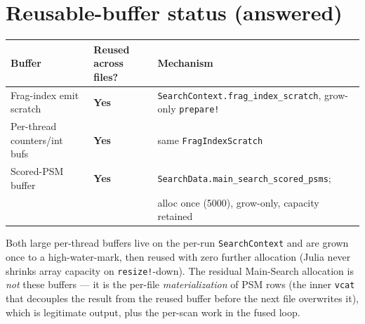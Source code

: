 \documentclass[11pt]{article}
\newcommand{\code}[1]{\texttt{\small #1}}
\begin{document}
\section{Reusable-buffer status (answered)}
\begin{center}
\begin{tabular}{lll}
\toprule
\textbf{Buffer} & \textbf{Reused across files?} & \textbf{Mechanism} \\
\midrule
Frag-index emit scratch & \textcolor{hi}{\textbf{Yes}} & \code{SearchContext.frag\_index\_scratch}, grow-only \code{prepare!} \\
Per-thread counters/int bufs & \textcolor{hi}{\textbf{Yes}} & same \code{FragIndexScratch} \\
Scored-PSM buffer & \textcolor{hi}{\textbf{Yes}} & \code{SearchData.main\_search\_scored\_psms}; \\
 & & alloc once (5000), grow-only, capacity retained \\
\bottomrule
\end{tabular}
\end{center}
\noindent Both large per-thread buffers live on the per-run \code{SearchContext}
and are grown once to a high-water-mark, then reused with zero further allocation
(Julia never shrinks array capacity on \code{resize!}-down). The residual
Main-Search allocation is \emph{not} these buffers --- it is the per-file
\emph{materialization} of PSM rows (the inner \code{vcat} that decouples the
result from the reused buffer before the next file overwrites it), which is
legitimate output, plus the per-scan work in the fused loop.
\end{document}
